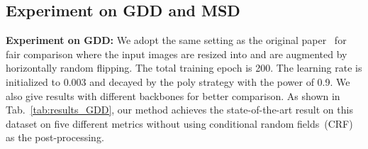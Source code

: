 \begin{table}[!t]\setlength{\tabcolsep}{6pt}
	\centering
	\begin{threeparttable}
		\caption{\small Comparison to state-of-the-art on Trans10k test set. All methods are trained on Trans10k training set under the same setting and all models use single scale inference. OS means the output stride in the backbone. }
		\label{tab:results_trans10k}
	\end{threeparttable}
	\vspace{-3mm}
\end{table}



\subsection{Experiment on GDD and MSD}
\noindent \textbf{Experiment on GDD:} We adopt the same setting as the original paper~\cite{tranparent_gdnet} for fair comparison where the input images are resized into  and are augmented by horizontally random flipping. The total training epoch is 200. The learning rate is initialized to 0.003 and decayed by the poly strategy with the power of 0.9. We also give results with different backbones for better comparison. As shown in Tab.~\ref{tab:results_GDD}, our method achieves the state-of-the-art result on this dataset on five different metrics without using conditional random fields~(CRF)~\cite{CRF} as the post-processing.

